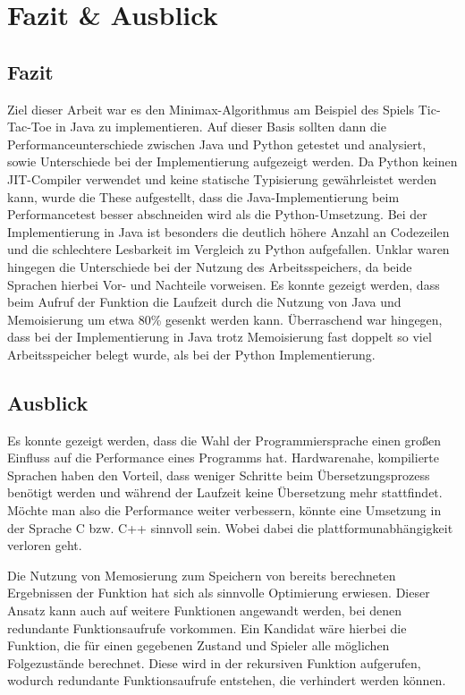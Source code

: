 \chapter{Fazit \& Ausblick}

\section{Fazit}
Ziel dieser Arbeit war es den Minimax-Algorithmus am Beispiel des Spiels Tic-Tac-Toe in Java zu implementieren. Auf dieser Basis 
sollten dann die Performanceunterschiede zwischen Java und Python getestet und analysiert, sowie Unterschiede bei der Implementierung 
aufgezeigt werden. Da Python keinen JIT-Compiler verwendet und keine statische Typisierung gewährleistet werden kann, wurde die These 
aufgestellt, dass die Java-Implementierung beim Performancetest besser abschneiden wird als die Python-Umsetzung. Bei der Implementierung 
in Java ist besonders die deutlich höhere Anzahl an Codezeilen und die schlechtere Lesbarkeit im Vergleich zu Python aufgefallen. 
Unklar waren hingegen die Unterschiede bei der Nutzung des Arbeitsspeichers, da beide Sprachen hierbei Vor- und Nachteile vorweisen. 
Es konnte gezeigt werden, dass beim Aufruf der  Funktion die Laufzeit durch die Nutzung von Java und Memoisierung um etwa 
80\% gesenkt werden kann. Überraschend war hingegen, dass bei der Implementierung in Java trotz Memoisierung fast doppelt so viel 
Arbeitsspeicher belegt wurde, als bei der Python Implementierung.


\section{Ausblick}
Es konnte gezeigt werden, dass die Wahl der Programmiersprache einen großen Einfluss auf die Performance eines Programms hat. 
Hardwarenahe, kompilierte Sprachen haben den Vorteil, dass weniger Schritte beim Übersetzungsprozess benötigt werden und während der Laufzeit 
keine Übersetzung mehr stattfindet. Möchte man also die Performance weiter verbessern, könnte eine Umsetzung in der Sprache C bzw. C++ sinnvoll 
sein. Wobei dabei die plattformunabhängigkeit verloren geht. 

Die Nutzung von Memosierung zum Speichern von bereits berechneten Ergebnissen der  Funktion hat sich als sinnvolle 
Optimierung erwiesen. Dieser Ansatz kann auch auf weitere Funktionen angewandt werden, bei denen redundante Funktionsaufrufe vorkommen. 
Ein Kandidat wäre hierbei die  Funktion, die für einen gegebenen Zustand und Spieler alle möglichen Folgezustände berechnet. 
Diese wird in der rekursiven  Funktion aufgerufen, wodurch redundante Funktionsaufrufe entstehen, die verhindert werden können. 

